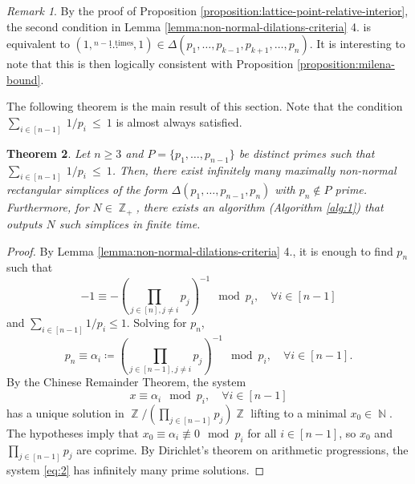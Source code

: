 \documentclass[a4paper,11pt]{amsart}
\theoremstyle{plain}
\newtheorem{theorem}{Theorem}[section]
\theoremstyle{definition}
\theoremstyle{remark}
\newtheorem{remark}[theorem]{Remark}
\DeclareMathOperator{\NN}{\mathbb{N}}
\DeclareMathOperator{\ZZ}{\mathbb{Z}}
\begin{document}
\begin{remark}
    By the proof of Proposition \ref{proposition:lattice-point-relative-interior}, the second condition in Lemma \ref{lemma:non-normal-dilations-criteria} 4. is equivalent to $(1, \stackrel{n - 1 \text{ times}}{\ldots}, 1) \in \Delta(p_1, \ldots, p_{k - 1}, p_{k + 1}, \ldots, p_n)$. It is interesting to note that this is then logically consistent with Proposition \ref{proposition:milena-bound}.
\end{remark}

The following theorem is the main result of this section. Note that the condition $\sum_{i \in [n - 1]}~1/p_i~\leq~1$ is almost always satisfied.

\begin{theorem}\label{theorem:infinitely-many-maximally-non-normal}
    Let $n \geq 3$ and $P = \{p_1, \ldots, p_{n - 1}\}$ be distinct primes such that $\sum_{i \in [n - 1]}~1/p_i~\leq~1$. Then, there exist infinitely many maximally non-normal rectangular simplices of the form $\Delta(p_1, \ldots, p_{n - 1}, p_n)$ with $p_n \notin P$ prime. Furthermore, for $N \in \ZZ_+$, there exists an algorithm (Algorithm \ref{alg:1}) that outputs $N$ such simplices in finite time.
\end{theorem}

\begin{proof}
    By Lemma \ref{lemma:non-normal-dilations-criteria} 4., it is enough to find $p_n$ such that
    \[
    -1 \equiv-\left(\prod_{j \in [n], j \neq i} p_j\right)^{-1} \mod{p_i}, \quad \forall i \in [n - 1]
    \]
    and $\sum_{i \in [n - 1]} 1/p_i \leq 1$.
    Solving for $p_n$,
    \[
    p_n \equiv \alpha_i \coloneqq \left(\prod_{j \in [n - 1], j \neq i} p_j\right)^{-1} \mod{p_i}, \quad \forall i \in [n-1].
    \]
    By the Chinese Remainder Theorem, the system
    \begin{equation}\label{eq:2}
        x \equiv \alpha_i \mod{p_i}, \quad \forall i \in [n - 1]
    \end{equation}
    has a unique solution in $\ZZ/(\prod_{j \in [n - 1]}p_j)\ZZ$ lifting to a minimal $x_0 \in \NN$. The hypotheses imply that $x_0 \equiv \alpha_i \not\equiv 0 \mod{p_i}$ for all $i \in [n - 1]$, so $x_0$ and $\prod_{j \in [n - 1]}p_j$ are coprime. By Dirichlet's theorem on arithmetic progressions, the system \eqref{eq:2} has infinitely many prime solutions.
\end{proof}
\end{document}
